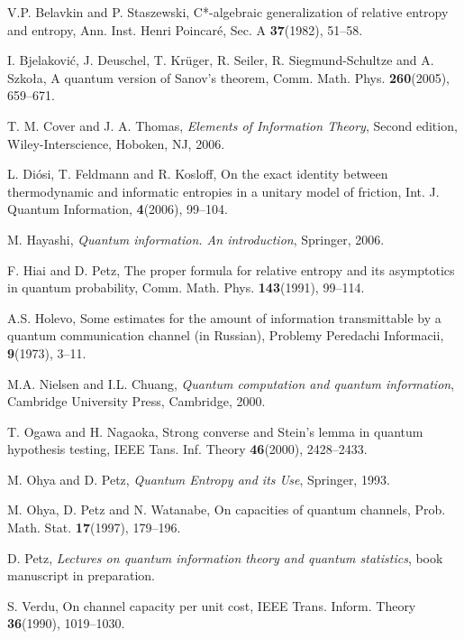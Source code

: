 \documentclass[12pt,a4paper]{article}
\begin{document}
\begin{thebibliography}{99}

V.P. Belavkin and  P. Staszewski, C*-algebraic
generalization of relative entropy and entropy, Ann. Inst. Henri
Poincar{\'e}, Sec. A {\bf 37}(1982), 51--58.

I. Bjelakovi\'c, J. Deuschel, T. Kr\"uger, R. Seiler, R. Siegmund-Schultze
and A. Szko\l a, A quantum version of Sanov's theorem,  Comm. Math. Phys.
{\bf 260}(2005), 659--671.

T. M. Cover and J. A. Thomas, {\it Elements of Information Theory},
Second edition, Wiley-Interscience, Hoboken, NJ, 2006.

L. Di\'osi, T. Feldmann and R. Kosloff, On the exact identity between thermodynamic
and informatic entropies in a unitary model of friction,
Int. J. Quantum Information, {\bf 4}(2006), 99--104.

M. Hayashi, {\it Quantum information. An introduction}, Springer, 2006.

F. Hiai and D. Petz, The proper formula for relative entropy and its
asymptotics in quantum probability,
Comm. Math. Phys. {\bf 143}(1991), 99--114.

A.S. Holevo, Some estimates for the amount of information transmittable by a
quantum communication channel (in Russian), Problemy Peredachi Informacii,
{\bf 9}(1973), 3--11.

M.A. Nielsen and I.L. Chuang, {\em Quantum computation and quantum information},
Cambridge University Press, Cambridge, 2000.

T. Ogawa and H. Nagaoka, Strong converse and Stein's lemma in
quantum hypothesis testing, IEEE Tans. Inf. Theory {\bf 46}(2000),
2428--2433.

M. Ohya and D. Petz, {\it Quantum Entropy and its Use}, Springer, 1993.

M. Ohya, D. Petz and N. Watanabe, On capacities of quantum channels,
Prob. Math. Stat. {\bf 17}(1997), 179--196.

D. Petz, {\it Lectures on quantum information theory and quantum statistics},
book manuscript in preparation.

S. Verdu, On channel capacity per unit cost, IEEE Trans. Inform. Theory
{\bf 36}(1990), 1019--1030.

\end{thebibliography}
\end{document}
